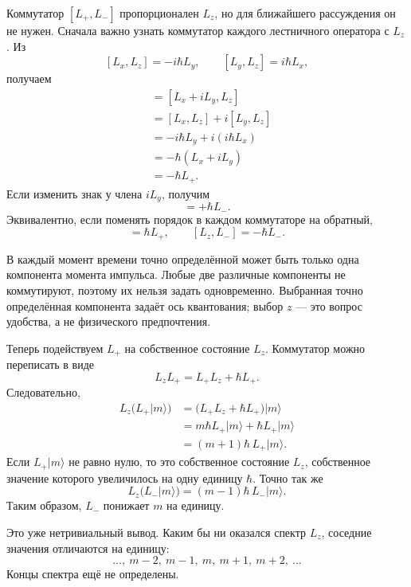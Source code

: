 Коммутатор \([L_+,L_-]\) пропорционален \(L_z\), но для ближайшего рассуждения он не нужен. Сначала важно узнать коммутатор каждого лестничного оператора с \(L_z\). Из \[
[L_x,L_z]=-i\hbar L_y,
\qquad
[L_y,L_z]=i\hbar L_x,
\] получаем \begin{align}
[L_+,L_z]
&=[L_x+iL_y,L_z] \\
&=[L_x,L_z]+i[L_y,L_z] \\
&=-i\hbar L_y+i(i\hbar L_x) \\
&=-\hbar(L_x+iL_y) \\
&=-\hbar L_+.
\end{align} Если изменить знак у члена \(iL_y\), получим \begin{equation}
[L_-,L_z]=+\hbar L_-.
\end{equation} Эквивалентно, если поменять порядок в каждом коммутаторе на обратный, \begin{equation}
[L_z,L_+]=\hbar L_+,
\qquad
[L_z,L_-]=-\hbar L_-.
\end{equation}

В каждый момент времени точно определённой может быть только одна компонента момента импульса. Любые две различные компоненты не коммутируют, поэтому их нельзя задать одновременно. Выбранная точно определённая компонента задаёт ось квантования; выбор \(z\) — это вопрос удобства, а не физического предпочтения.

Теперь подействуем \(L_+\) на собственное состояние \(L_z\). Коммутатор можно переписать в виде \begin{equation}
L_zL_+=L_+L_z+\hbar L_+.
\end{equation} Следовательно, \begin{align}
L_z\bigl(L_+\lvert m\rangle\bigr)
&=\bigl(L_+L_z+\hbar L_+\bigr)\lvert m\rangle \\
&=m\hbar L_+\lvert m\rangle+\hbar L_+\lvert m\rangle \\
&=(m+1)\hbar\,L_+\lvert m\rangle.
\end{align} Если \(L_+\lvert m\rangle\) не равно нулю, то это собственное состояние \(L_z\), собственное значение которого увеличилось на одну единицу \(\hbar\). Точно так же \begin{equation}
L_z\bigl(L_-\lvert m\rangle\bigr)
=(m-1)\hbar\,L_-\lvert m\rangle.
\end{equation} Таким образом, \(L_-\) понижает \(m\) на единицу.

Это уже нетривиальный вывод. Каким бы ни оказался спектр \(L_z\), соседние значения отличаются на единицу: \begin{equation}
\ldots,\ m-2,\ m-1,\ m,\ m+1,\ m+2,\ \ldots
\end{equation} Концы спектра ещё не определены.

